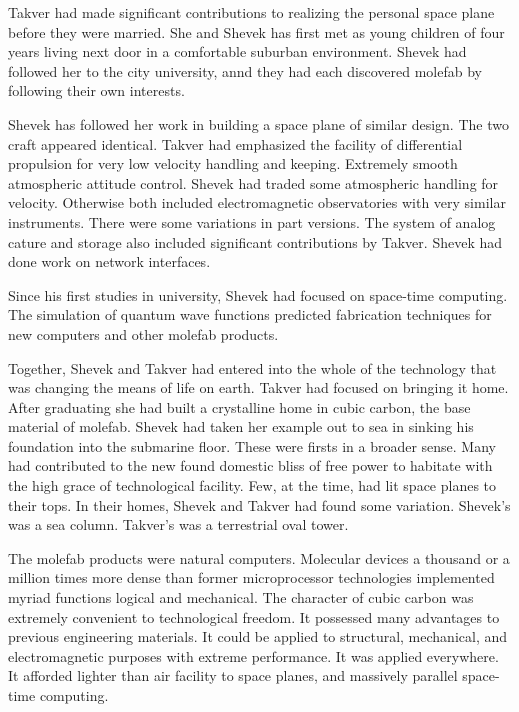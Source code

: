 Takver had made significant contributions to realizing the personal
space plane before they were married.  She and Shevek has first met as
young children of four years living next door in a comfortable
suburban environment.  Shevek had followed her to the city university,
annd they had each discovered molefab by following their own
interests.

Shevek has followed her work in building a space plane of similar
design.  The two craft appeared identical.  Takver had emphasized the
facility of differential propulsion for very low velocity handling and
keeping.  Extremely smooth atmospheric attitude control.  Shevek had
traded some atmospheric handling for velocity.  Otherwise both
included electromagnetic observatories with very similar instruments.
There were some variations in part versions.  The system of analog
cature and storage also included significant contributions by Takver.
Shevek had done work on network interfaces.

Since his first studies in university, Shevek had focused on
space-time computing.  The simulation of quantum wave functions
predicted fabrication techniques for new computers and other molefab
products.  

Together, Shevek and Takver had entered into the whole of the
technology that was changing the means of life on earth.  Takver had
focused on bringing it home.  After graduating she had built a
crystalline home in cubic carbon, the base material of molefab.
Shevek had taken her example out to sea in sinking his foundation into
the submarine floor.  These were firsts in a broader sense.  Many had
contributed to the new found domestic bliss of free power to habitate
with the high grace of technological facility.  Few, at the time, had
lit space planes to their tops.  In their homes, Shevek and Takver had
found some variation.  Shevek's was a sea column.  Takver's was a
terrestrial oval tower.

The molefab products were natural computers.  Molecular devices a
thousand or a million times more dense than former microprocessor
technologies implemented myriad functions logical and mechanical.  The
character of cubic carbon was extremely convenient to technological
freedom.  It possessed many advantages to previous engineering
materials.  It could be applied to structural, mechanical, and
electromagnetic purposes with extreme performance.  It was applied
everywhere.  It afforded lighter than air facility to space planes,
and massively parallel space-time computing.

